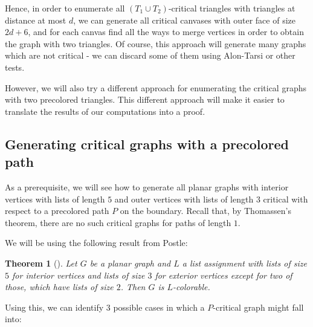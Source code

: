 \documentclass{article}
\newtheorem{theorem}{Theorem}
\begin{document}
Hence, in order to enumerate all $(T_1 \cup T_2)$-critical triangles with triangles at distance at most $d$, we can generate all critical canvases with outer face of size $2d+6$, and for each canvas find all the ways to merge vertices in order to obtain the graph with two triangles. Of course, this approach will generate many graphs which are not critical - we can discard some of them using Alon-Tarsi or other tests.

However, we will also try a different approach for enumerating the critical graphs with two precolored triangles. This different approach will make it easier to translate the results of our computations into a proof. 

\subsection{Generating critical graphs with a precolored path}

As a prerequisite, we will see how to generate all planar graphs with interior vertices with lists of length $5$ and outer vertices with lists of length $3$ critical with respect to a precolored path $P$ on the boundary. Recall that, by Thomassen's theorem, there are no such critical graphs for paths of length $1$. 

We will be using the following result from Postle:

\begin{theorem}[\cite{fivelistcoloring1}]
Let $G$ be a planar graph and $L$ a list assignment with lists of size $5$ for interior vertices and lists of size $3$ for exterior vertices except for two of those, which have lists of size $2$. Then $G$ is $L$-colorable. 
\end{theorem}

Using this, we can identify $3$ possible cases in which a $P$-critical graph might fall into:
\end{document}
